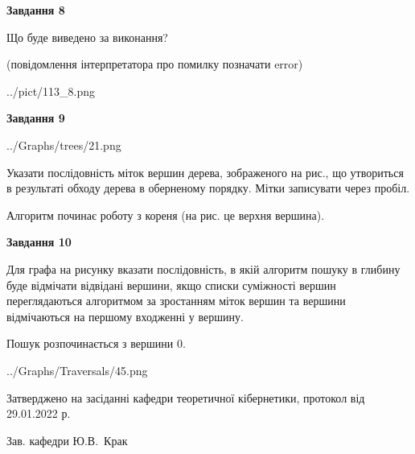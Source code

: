 \documentclass[12pt, ukrainian]{article}
\begin{document}
{\begin {large}
{\begin {center}\textbf{Завдання 8}\end {center}}\par
Що буде виведено за виконання?\par
 (повідомлення інтерпретатора про помилку позначати error)\par
\begin{center}
	{../pict/113_8.png}
\end{center}
\newpage

{\begin {center}\textbf{Завдання 9}\end {center}}\par

\begin{center}
	{../Graphs/trees/21.png}
\end{center}
Указати послідовність міток вершин дерева, зображеного на рис., що утвориться в результаті обходу дерева в оберненому порядку. Мітки записувати через пробіл.\par Алгоритм починає роботу з кореня (на рис. це верхня вершина).\par
\newpage

{\begin {center}\textbf{Завдання 10}\end {center}}\par
Для графа на рисунку вказати послідовність, в якій алгоритм пошуку в глибину буде відмічати відвідані вершини, якщо списки суміжності вершин переглядаються алгоритмом за зростанням міток вершин та вершини відмічаються на першому вход\-женні у вершину.\par
Пошук розпочинається з вершини 0.\par

\begin{center}
	{../Graphs/Traversals/45.png}
\end{center}\par
\newpage


\end {large}
}
{\smallskip \begin {small} Затверджено на засіданні кафедри теоретичної кібернетики, протокол  від   29.01.2022 р.\par\smallskip\smallskip
{\parbox {6.5 cm}{Зав. кафедри \dotfill Ю.В.~Крак}} \end{small}}
\end{document}
